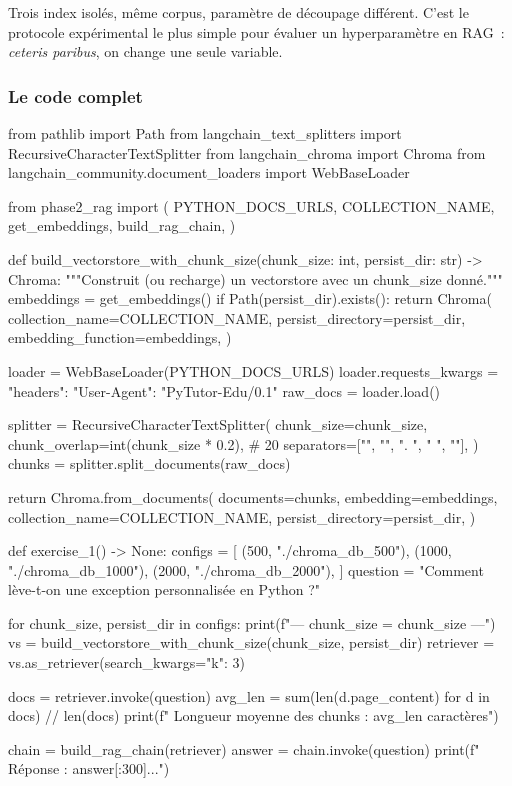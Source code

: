 \documentclass[11pt,a4paper]{article}
\begin{document}
Trois index isolés, même corpus, paramètre de découpage différent. C'est
le protocole expérimental le plus simple pour évaluer un hyperparamètre
en RAG~: \emph{ceteris paribus}, on change une seule variable.

\subsubsection{Le code complet}

\begin{pythoncode}
from pathlib import Path
from langchain_text_splitters import RecursiveCharacterTextSplitter
from langchain_chroma import Chroma
from langchain_community.document_loaders import WebBaseLoader

from phase2_rag import (
    PYTHON_DOCS_URLS, COLLECTION_NAME, get_embeddings, build_rag_chain,
)


def build_vectorstore_with_chunk_size(chunk_size: int, persist_dir: str) -> Chroma:
    """Construit (ou recharge) un vectorstore avec un chunk_size donné."""
    embeddings = get_embeddings()
    if Path(persist_dir).exists():
        return Chroma(
            collection_name=COLLECTION_NAME,
            persist_directory=persist_dir,
            embedding_function=embeddings,
        )

    loader = WebBaseLoader(PYTHON_DOCS_URLS)
    loader.requests_kwargs = {"headers": {"User-Agent": "PyTutor-Edu/0.1"}}
    raw_docs = loader.load()

    splitter = RecursiveCharacterTextSplitter(
        chunk_size=chunk_size,
        chunk_overlap=int(chunk_size * 0.2),       # 20%
        separators=["\n\n", "\n", ". ", " ", ""],
    )
    chunks = splitter.split_documents(raw_docs)

    return Chroma.from_documents(
        documents=chunks, embedding=embeddings,
        collection_name=COLLECTION_NAME, persist_directory=persist_dir,
    )


def exercise_1() -> None:
    configs = [
        (500,  "./chroma_db_500"),
        (1000, "./chroma_db_1000"),
        (2000, "./chroma_db_2000"),
    ]
    question = "Comment lève-t-on une exception personnalisée en Python ?"

    for chunk_size, persist_dir in configs:
        print(f"\n--- chunk_size = {chunk_size} ---")
        vs = build_vectorstore_with_chunk_size(chunk_size, persist_dir)
        retriever = vs.as_retriever(search_kwargs={"k": 3})

        docs = retriever.invoke(question)
        avg_len = sum(len(d.page_content) for d in docs) // len(docs)
        print(f"  Longueur moyenne des chunks : {avg_len} caractères")

        chain = build_rag_chain(retriever)
        answer = chain.invoke(question)
        print(f"  Réponse : {answer[:300]}...")
\end{pythoncode}
\end{document}
